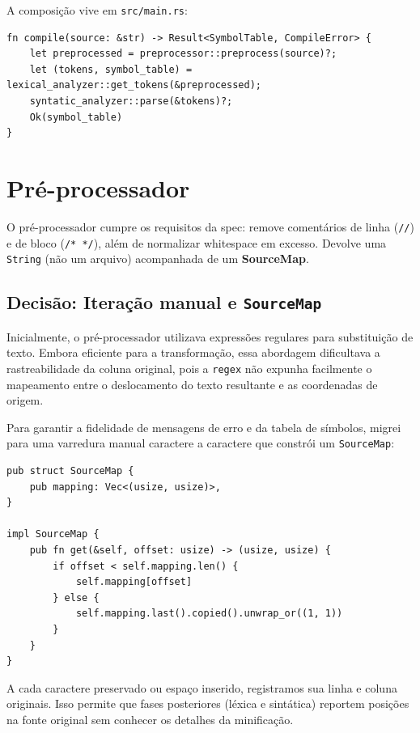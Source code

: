\documentclass[12pt,a4paper]{article}
\begin{document}
A composição vive em \texttt{src/main.rs}:

\begin{lstlisting}[caption={Pipeline em \texttt{main.rs}}]
fn compile(source: &str) -> Result<SymbolTable, CompileError> {
    let preprocessed = preprocessor::preprocess(source)?;
    let (tokens, symbol_table) = lexical_analyzer::get_tokens(&preprocessed);
    syntatic_analyzer::parse(&tokens)?;
    Ok(symbol_table)
}
\end{lstlisting}

\section{Pré-processador}

O pré-processador cumpre os requisitos da spec: remove comentários de
linha (\verb|//|) e de bloco (\verb|/* */|), além de normalizar
whitespace em excesso. Devolve uma \texttt{String} (não um arquivo)
acompanhada de um \textbf{SourceMap}.

\subsection{Decisão: Iteração manual e \texttt{SourceMap}}

Inicialmente, o pré-processador utilizava expressões regulares para
substituição de texto. Embora eficiente para a transformação, essa
abordagem dificultava a rastreabilidade da coluna original, pois a
\texttt{regex} não expunha facilmente o mapeamento entre o deslocamento
do texto resultante e as coordenadas de origem.

Para garantir a fidelidade de mensagens de erro e da tabela de
símbolos, migrei para uma varredura manual caractere a caractere que
constrói um \texttt{SourceMap}:

\begin{lstlisting}[caption={Estrutura de mapeamento de origem}]
pub struct SourceMap {
    pub mapping: Vec<(usize, usize)>,
}

impl SourceMap {
    pub fn get(&self, offset: usize) -> (usize, usize) {
        if offset < self.mapping.len() {
            self.mapping[offset]
        } else {
            self.mapping.last().copied().unwrap_or((1, 1))
        }
    }
}
\end{lstlisting}

A cada caractere preservado ou espaço inserido, registramos sua linha
e coluna originais. Isso permite que fases posteriores (léxica e
sintática) reportem posições na fonte original sem conhecer os detalhes
da minificação.
\end{document}
